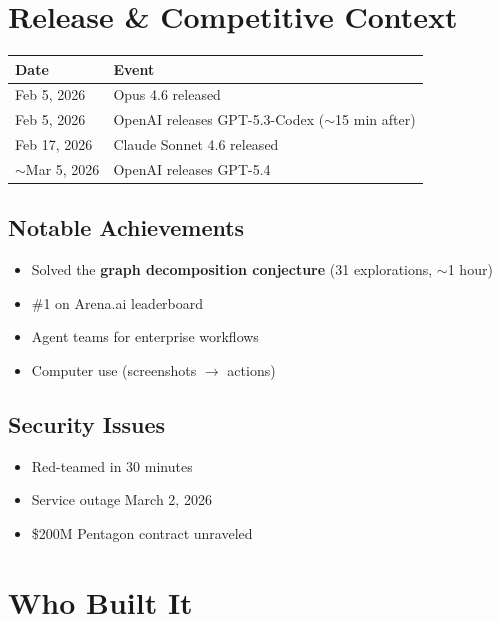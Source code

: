 \documentclass[11pt,a4paper]{article}
\begin{document}
\section{Release \& Competitive Context}

\begin{center}
\begin{tabular}{ll}
\toprule
\textbf{Date} & \textbf{Event} \\
\midrule
Feb 5, 2026 & Opus 4.6 released \\
Feb 5, 2026 & OpenAI releases GPT-5.3-Codex ($\sim$15 min after) \\
Feb 17, 2026 & Claude Sonnet 4.6 released \\
$\sim$Mar 5, 2026 & OpenAI releases GPT-5.4 \\
\bottomrule
\end{tabular}
\end{center}

\subsection{Notable Achievements}

\begin{itemize}
  \item Solved the \textbf{graph decomposition conjecture} (31 explorations, $\sim$1 hour)
  \item \#1 on Arena.ai leaderboard
  \item Agent teams for enterprise workflows
  \item Computer use (screenshots $\to$ actions)
\end{itemize}

\subsection{Security Issues}

\begin{itemize}
  \item Red-teamed in 30 minutes
  \item Service outage March 2, 2026
  \item \$200M Pentagon contract unraveled
\end{itemize}

\section{Who Built It}
\end{document}
